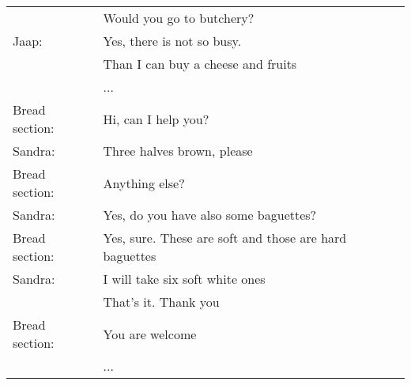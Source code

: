 \documentclass{tstextbook}
\begin{document}
\begin{definition}
\begin{tabular}{ll}
			& Would you go to butchery? \\
			Jaap: & Yes, there is not so busy. \\
			& Than I can buy a cheese and fruits \\
			& ... \\
			Bread section: & Hi, can I help you? \\
			Sandra: & Three halves brown, please\\
			Bread section: & Anything else? \\
			Sandra: & Yes, do you have also some baguettes? \\
			Bread section: & Yes, sure. These are soft and those are hard baguettes \\
			Sandra: & I will take six soft white ones \\
			& That's it. Thank you \\
			Bread section: & You are welcome \\
			& ... \\
			
		\end{tabular}
	\end{definition}
			
		\newpage	
			
\end{document}
